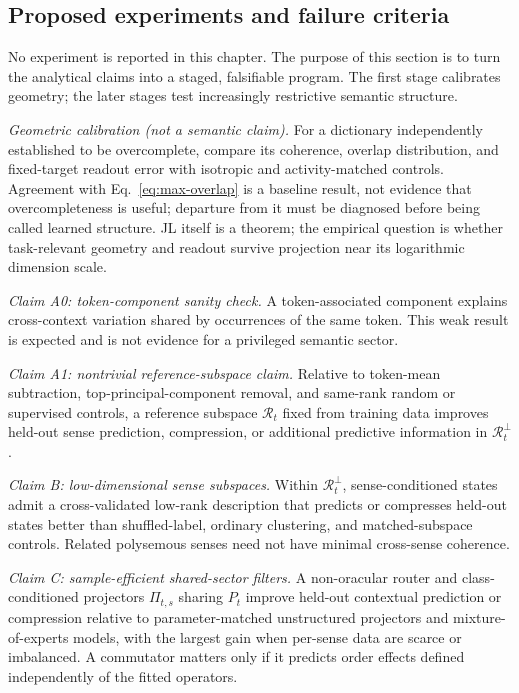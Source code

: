 \documentclass[
  aps,
  reprint,
  superscriptaddress,
  floatfix,
  nofootinbib,
  longbibliography
]{revtex4-2}
\begin{document}
\subsection{Proposed experiments and failure criteria}
\label{sec:predictions}

No experiment is reported in this chapter.  The purpose of this section is to
turn the analytical claims into a staged, falsifiable program.  The first
stage calibrates geometry; the later stages test increasingly restrictive
semantic structure.

\emph{Geometric calibration (not a semantic claim).}
For a dictionary independently established to be overcomplete, compare its
coherence, overlap distribution, and fixed-target readout error with isotropic
and activity-matched controls.  Agreement with Eq.~\eqref{eq:max-overlap} is a
baseline result, not evidence that overcompleteness is useful; departure from
it must be diagnosed before being called learned structure.  JL itself is a
theorem; the empirical question is whether task-relevant geometry and readout
survive projection near its logarithmic dimension scale.

\emph{Claim A0: token-component sanity check.}
A token-associated component explains cross-context variation shared by
occurrences of the same token.  This weak result is expected and is not
evidence for a privileged semantic sector.

\emph{Claim A1: nontrivial reference-subspace claim.}
Relative to token-mean subtraction, top-principal-component removal, and
same-rank random or supervised controls, a reference subspace $\mathcal R_t$
fixed from training data improves held-out sense prediction, compression, or
additional predictive information in $\mathcal R_t^\perp$.

\emph{Claim B: low-dimensional sense subspaces.}
Within $\mathcal R_t^\perp$, sense-conditioned states admit a cross-validated
low-rank description that predicts or compresses held-out states better than
shuffled-label, ordinary clustering, and matched-subspace controls.  Related
polysemous senses need not have minimal cross-sense coherence.

\emph{Claim C: sample-efficient shared-sector filters.}
A non-oracular router and class-conditioned projectors $\Pi_{t,s}$ sharing $P_t$ improve
held-out contextual prediction or compression relative to parameter-matched
unstructured projectors and mixture-of-experts models, with the largest gain
when per-sense data are scarce or imbalanced.  A commutator matters
only if it predicts order effects defined independently of the fitted
operators.
\end{document}
